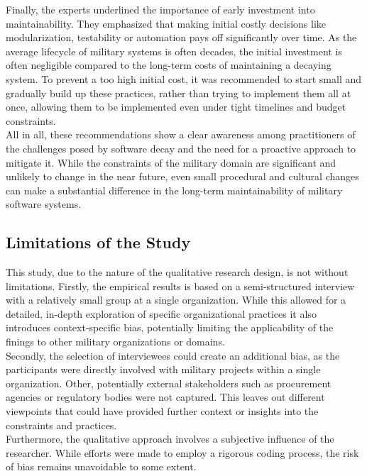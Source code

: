 Finally, the experts underlined the importance of early investment into maintainability. They emphasized that making initial costly decisions like modularization, testability or automation pays off significantly over time.
As the average lifecycle of military systems is often decades, the initial investment is often negligible compared to the long-term costs of maintaining a decaying system.
To prevent a too high initial cost, it was recommended to start small and gradually build up these practices, rather than trying to implement them all at once, allowing them to be implemented even under tight timelines and budget constraints.\\

All in all, these recommendations show a clear awareness among practitioners of the challenges posed by software decay and the need for a proactive approach to mitigate it. While the constraints of the military domain are significant and unlikely to change in the near future, even small procedural and 
cultural changes can make a substantial difference in the long-term maintainability of military software systems.\\

\subsection{Limitations of the Study}
This study, due to the nature of the qualitative research design, is not without limitations. Firstly, the empirical results is based on a semi-structured interview with a relatively small group at a single organization.
While this allowed for a detailed, in-depth exploration of specific organizational practices it also introduces context-specific bias, potentially limiting the applicability of the finings to other military organizations or domains.\\

Secondly, the selection of interviewees could create an additional bias, as the participants were directly involved with military projects within a single organization. Other, potentially external stakeholders such as procurement agencies
or regulatory bodies were not captured. This leaves out different viewpoints that could have provided further context or insights into the constraints and practices.\\

Furthermore, the qualitative approach involves a subjective influence of the researcher. While efforts were made to employ a rigorous coding process, the risk of bias remains unavoidable to some extent.\\

